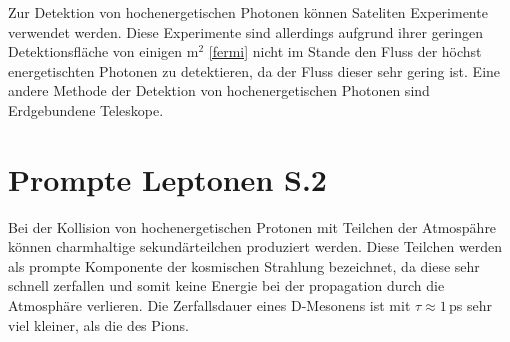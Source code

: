 Zur Detektion von hochenergetischen Photonen können Sateliten Experimente verwendet werden. Diese Experimente sind allerdings aufgrund ihrer geringen Detektionsfläche von einigen m$^2$ \ref{fermi} nicht im Stande den Fluss der höchst energetischten Photonen zu detektieren, da der Fluss dieser sehr gering ist. Eine andere Methode der Detektion von hochenergetischen Photonen sind Erdgebundene Teleskope. 
\section{Prompte Leptonen S.2}\label{ab:CRprompt}
Bei der Kollision von hochenergetischen Protonen mit Teilchen der Atmospähre können charmhaltige sekundärteilchen produziert werden. Diese Teilchen werden als prompte Komponente der kosmischen Strahlung bezeichnet, da diese sehr schnell zerfallen und somit keine Energie bei der propagation durch die Atmosphäre verlieren. Die Zerfallsdauer eines D-Mesonens ist mit $\tau \approx 1$\,ps sehr viel kleiner, als die des Pions. 